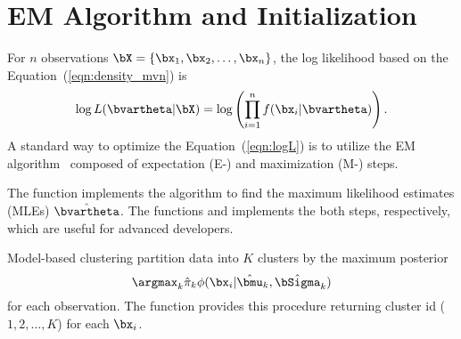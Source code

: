 
\section[EM Algorithm and Initialization]{EM Algorithm and Initialization}
\label{sec:em_init}

For $n$ observations $\bX = \{\bx_1,\bx_2,\ldots,\bx_n\}$, the log
likelihood based on the Equation~(\ref{eqn:density_mvn}) is
\begin{equation}
\log L(\bvartheta | \bX) = \log
\left(
\prod_{i=1}^n f(\bx_i | \bvartheta)
\right).
\label{eqn:logL}
\end{equation}
A standard way to optimize the Equation~(\ref{eqn:logL}) is to utilize
the EM algorithm~\citep{Dempster1977} composed of
expectation (E-) and maximization (M-) steps.

The  function  implements the algorithm to find
the maximum likelihood estimates (MLEs) $\hat{\bvartheta}$.
The  functions  and  implements the
both steps, respectively, which are useful for advanced developers.

Model-based clustering partition data into $K$ clusters
by the maximum posterior
$$
\argmax_{k} \hat{\pi}_k \phi(\bx_i | \hat{\bmu}_k, \hat{\bSigma}_k)
$$
for each observation.
The  function  provides this procedure
returning cluster id ($1,2,\ldots,K$) for each $\bx_i$.


